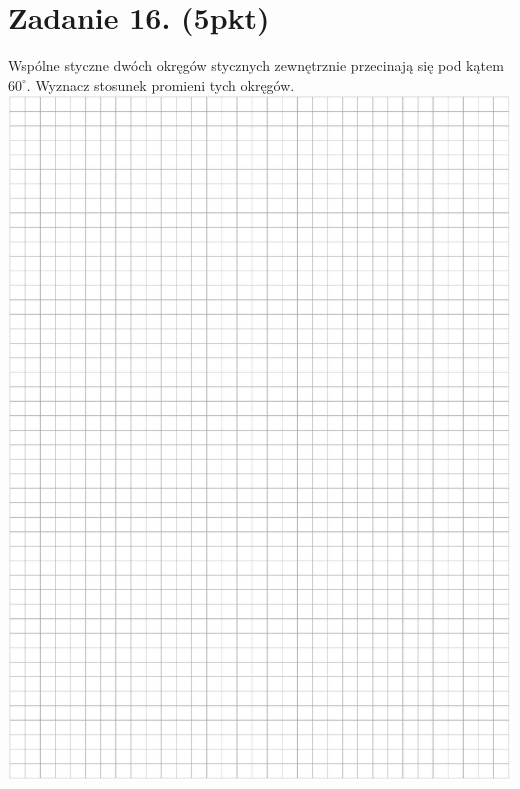\documentclass[10pt]{article}
\begin{document}
\section*{Zadanie 16. (5pkt)}
Wspólne styczne dwóch okręgów stycznych zewnętrznie przecinają się pod kątem \(60^{\circ}\). Wyznacz stosunek promieni tych okręgów.\\
\includegraphics[max width=\textwidth, center]{2024_11_21_439e1d90cd1e7f928ae2g-14}
\end{document}
